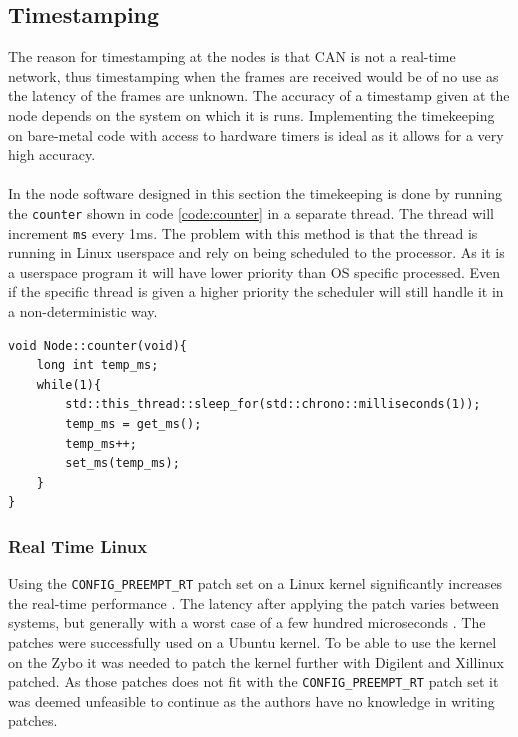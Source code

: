 
\subsection{Timestamping}\label{sec:time}
The reason for timestamping at the nodes is that CAN is not a real-time network, thus timestamping when the frames are received would be of no use as the latency of the frames are unknown.
The accuracy of a timestamp given at the node depends on the system on which it is runs. 
Implementing the timekeeping on bare-metal code with access to hardware timers is ideal as it allows for a very high accuracy.
\\~\\
In the node software designed in this section the timekeeping is done by running the \texttt{counter} shown in code \ref{code:counter} in a separate thread.
The thread will increment \texttt{ms} every 1ms.
The problem with this method is that the thread is running in Linux userspace and rely on being scheduled to the processor. 
As it is a userspace program it will have lower priority than OS specific processed.
Even if the specific thread is given a higher priority the scheduler will still handle it in a non-deterministic way.

\begin{lstlisting}[caption=Declaration of counter function.,label=code:counter]
void Node::counter(void){
	long int temp_ms;
	while(1){
		std::this_thread::sleep_for(std::chrono::milliseconds(1));
		temp_ms = get_ms();
		temp_ms++;
		set_ms(temp_ms);
	}
}
\end{lstlisting}

\subsubsection*{Real Time Linux}
Using the \texttt{CONFIG\_PREEMPT\_RT} patch set on a Linux kernel significantly increases the real-time performance \cite{real_time_linux}.
The latency after applying the patch varies between systems, but generally with a worst case of a few hundred microseconds \cite{real_time_linux1}.
The patches were successfully used on a Ubuntu kernel.
To be able to use the kernel on the Zybo it was needed to patch the kernel further with Digilent and Xillinux patched.
As those patches does not fit with the \texttt{CONFIG\_PREEMPT\_RT} patch set it was deemed unfeasible to continue as the authors have no knowledge in writing patches. 
